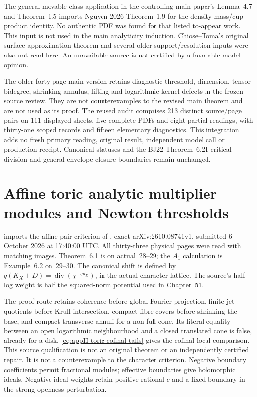 The general movable-class application in the controlling main paper's
Lemma~4.7 and Theorem~1.5 imports Nguyen 2026 Theorem~1.9 for the
density mass/cup-product identity. No authentic PDF was found for that
listed to-appear work. This input is not used in the main analyticity
induction. Chiose--Toma's original surface approximation theorem and
several older support/resolution inputs were also not read here.
An unavailable source is not certified by a favorable model opinion.

The older forty-page main version retains diagnostic threshold, dimension,
tensor-bidegree, shrinking-annulus, lifting and logarithmic-kernel defects
in the frozen source review. They are not counterexamples to the revised
main theorem and are not used as its proof. The reused audit comprises
213 distinct source/page pairs on 111 displayed sheets, five complete
PDFs and eight partial readings, with thirty-one scoped records and
fifteen elementary diagnostics. This integration adds no fresh primary
reading, original result, independent model call or production receipt.
Canonical statuses and the BJ22 Theorem~6.21 critical division and
general envelope-closure boundaries remain unchanged.

\section{Affine toric analytic multiplier modules and Newton thresholds}
\label{sec:provenance-toric-analytic-multiplier}

 imports the affine-pair
criterion of \cite{Seo26ToricMultiplierV1}, exact
arXiv:2610.08741v1, submitted 6 October 2026 at 17:40:00 UTC.
All thirty-three physical pages were read with matching images.
Theorem~6.1 is on actual~28--29; the $A_1$ calculation is
Example~6.2 on~29--30. The canonical shift is defined by
$q(K_X+D)=\operatorname{div}(\chi^{-q u_D})$, in the actual
character lattice. The source's half-log weight is half the
squared-norm potential used in Chapter~51.

The proof route retains coherence before global Fourier projection,
finite jet quotients before Krull intersection, compact fibre covers
before shrinking the base, and compact transverse annuli for a
non-full cone. Its literal equality between an open logarithmic
neighbourhood and a closed translated cone is false, already for a
disk. \eqref{eq:appH-toric-cofinal-tails} gives the cofinal local
comparison. This source qualification is not an original theorem
or an independently certified repair. It is not a counterexample
to the character criterion. Negative boundary coefficients permit
fractional modules; effective boundaries give holomorphic ideals.
Negative ideal weights retain positive rational $c$ and a fixed
boundary in the strong-openness perturbation.

